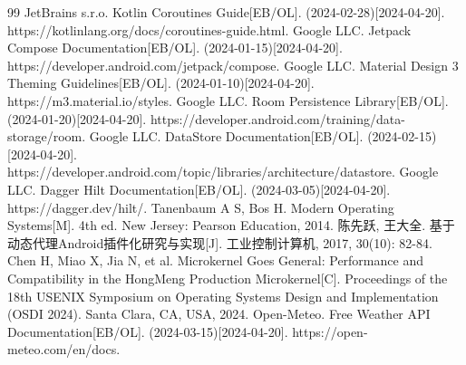 \documentclass[12pt,AutoFakeBold]{xuptThesis}
\begin{document}
\begin{thebibliography}{99}
 JetBrains s.r.o. Kotlin Coroutines Guide[EB/OL]. (2024-02-28)[2024-04-20]. https://kotlinlang.org/docs/coroutines-guide.html.
 Google LLC. Jetpack Compose Documentation[EB/OL]. (2024-01-15)[2024-04-20]. https://developer.android.com/jetpack/compose.
 Google LLC. Material Design 3 Theming Guidelines[EB/OL]. (2024-01-10)[2024-04-20]. https://m3.material.io/styles.
 Google LLC. Room Persistence Library[EB/OL]. (2024-01-20)[2024-04-20]. https://developer.android.com/training/data-storage/room.
 Google LLC. DataStore Documentation[EB/OL]. (2024-02-15)[2024-04-20]. https://developer.android.com/topic/libraries/architecture/datastore.
 Google LLC. Dagger Hilt Documentation[EB/OL]. (2024-03-05)[2024-04-20]. https://dagger.dev/hilt/.
 Tanenbaum A S, Bos H. Modern Operating Systems[M]. 4th ed. New Jersey: Pearson Education, 2014.
 陈先跃, 王大全. 基于动态代理Android插件化研究与实现[J]. 工业控制计算机, 2017, 30(10): 82-84.
 Chen H, Miao X, Jia N, et al. Microkernel Goes General: Performance and Compatibility in the HongMeng Production Microkernel[C]. Proceedings of the 18th USENIX Symposium on Operating Systems Design and Implementation (OSDI 2024). Santa Clara, CA, USA, 2024.
 Open-Meteo. Free Weather API Documentation[EB/OL]. (2024-03-15)[2024-04-20]. https://open-meteo.com/en/docs.
\end{thebibliography}




\end{document}
